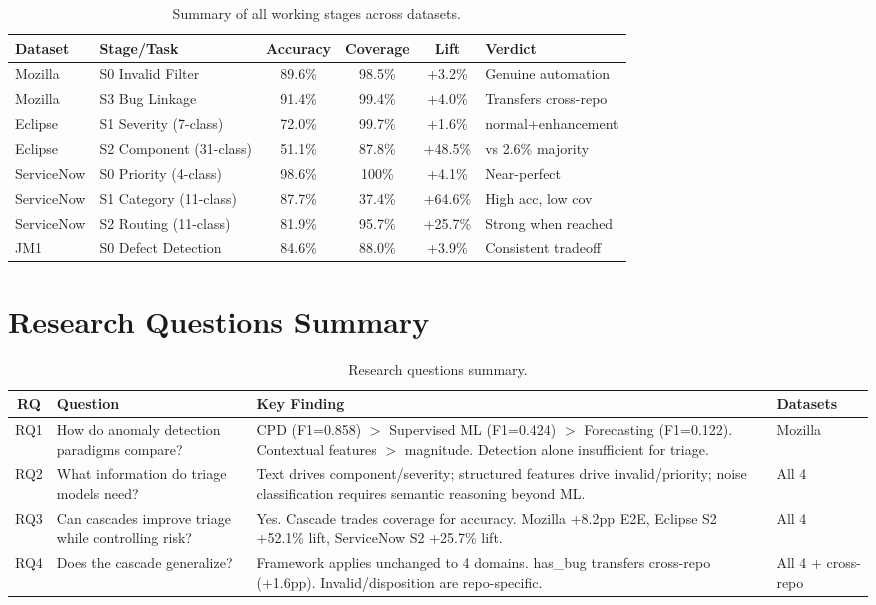 \documentclass[11pt]{article}
\begin{document}
\begin{table}[h]
\centering
\caption{Summary of all working stages across datasets.}
\label{tab:all-stages-summary}
\begin{tabular}{llcccl}
\toprule
\textbf{Dataset} & \textbf{Stage/Task} & \textbf{Accuracy} & \textbf{Coverage} & \textbf{Lift} & \textbf{Verdict} \\
\midrule
Mozilla & S0 Invalid Filter & 89.6\% & 98.5\% & +3.2\% & Genuine automation \\
Mozilla & S3 Bug Linkage & 91.4\% & 99.4\% & +4.0\% & Transfers cross-repo \\
Eclipse & S1 Severity (7-class) & 72.0\% & 99.7\% & +1.6\% & normal+enhancement \\
Eclipse & S2 Component (31-class) & 51.1\% & 87.8\% & +48.5\% & vs 2.6\% majority \\
ServiceNow & S0 Priority (4-class) & 98.6\% & 100\% & +4.1\% & Near-perfect \\
ServiceNow & S1 Category (11-class) & 87.7\% & 37.4\% & +64.6\% & High acc, low cov \\
ServiceNow & S2 Routing (11-class) & 81.9\% & 95.7\% & +25.7\% & Strong when reached \\
JM1 & S0 Defect Detection & 84.6\% & 88.0\% & +3.9\% & Consistent tradeoff \\
\bottomrule
\end{tabular}
\end{table}

\section{Research Questions Summary}
\label{sec:rq-summary}

\begin{table}[h]
\centering
\caption{Research questions summary.}
\label{tab:rq-summary}
\begin{tabular}{cp{3.5cm}p{6cm}l}
\toprule
\textbf{RQ} & \textbf{Question} & \textbf{Key Finding} & \textbf{Datasets} \\
\midrule
RQ1 & How do anomaly detection paradigms compare? & CPD (F1=0.858) $>$ Supervised ML (F1=0.424) $>$ Forecasting (F1=0.122). Contextual features $>$ magnitude. Detection alone insufficient for triage. & Mozilla \\
RQ2 & What information do triage models need? & Text drives component/severity; structured features drive invalid/priority; noise classification requires semantic reasoning beyond ML. & All 4 \\
RQ3 & Can cascades improve triage while controlling risk? & Yes. Cascade trades coverage for accuracy. Mozilla +8.2pp E2E, Eclipse S2 +52.1\% lift, ServiceNow S2 +25.7\% lift. & All 4 \\
RQ4 & Does the cascade generalize? & Framework applies unchanged to 4 domains. has\_bug transfers cross-repo (+1.6pp). Invalid/disposition are repo-specific. & All 4 + cross-repo \\
\bottomrule
\end{tabular}
\end{table}
\end{document}
